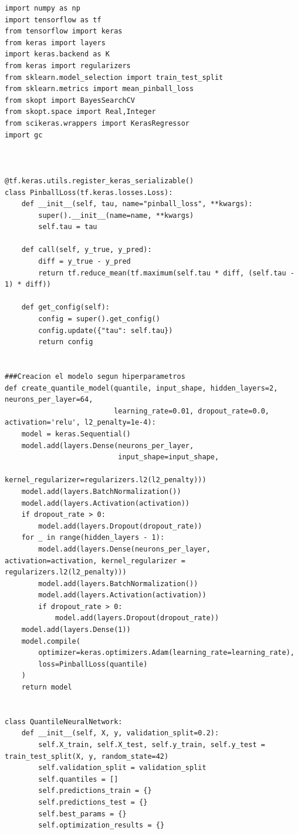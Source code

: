\documentclass[11pt]{book}
\theoremstyle{plain} %
\theoremstyle{definition} %
\begin{document}
 \begin{lstlisting}[style=pythonstyle, caption=neuralnetwork.py]
   import numpy as np
import tensorflow as tf
from tensorflow import keras
from keras import layers
import keras.backend as K
from keras import regularizers
from sklearn.model_selection import train_test_split
from sklearn.metrics import mean_pinball_loss
from skopt import BayesSearchCV
from skopt.space import Real,Integer
from scikeras.wrappers import KerasRegressor
import gc



@tf.keras.utils.register_keras_serializable()
class PinballLoss(tf.keras.losses.Loss):
    def __init__(self, tau, name="pinball_loss", **kwargs):
        super().__init__(name=name, **kwargs)
        self.tau = tau

    def call(self, y_true, y_pred):
        diff = y_true - y_pred
        return tf.reduce_mean(tf.maximum(self.tau * diff, (self.tau - 1) * diff))

    def get_config(self):
        config = super().get_config()
        config.update({"tau": self.tau})
        return config


###Creacion el modelo segun hiperparametros
def create_quantile_model(quantile, input_shape, hidden_layers=2, neurons_per_layer=64,
                          learning_rate=0.01, dropout_rate=0.0, activation='relu', l2_penalty=1e-4):
    model = keras.Sequential()
    model.add(layers.Dense(neurons_per_layer,
                           input_shape=input_shape,
                           kernel_regularizer=regularizers.l2(l2_penalty)))
    model.add(layers.BatchNormalization()) 
    model.add(layers.Activation(activation))
    if dropout_rate > 0:
        model.add(layers.Dropout(dropout_rate))
    for _ in range(hidden_layers - 1):
        model.add(layers.Dense(neurons_per_layer, activation=activation, kernel_regularizer = regularizers.l2(l2_penalty)))
        model.add(layers.BatchNormalization())  
        model.add(layers.Activation(activation))
        if dropout_rate > 0:
            model.add(layers.Dropout(dropout_rate))
    model.add(layers.Dense(1))
    model.compile(
        optimizer=keras.optimizers.Adam(learning_rate=learning_rate),
        loss=PinballLoss(quantile)
    )
    return model


class QuantileNeuralNetwork:
    def __init__(self, X, y, validation_split=0.2):
        self.X_train, self.X_test, self.y_train, self.y_test = train_test_split(X, y, random_state=42)
        self.validation_split = validation_split
        self.quantiles = []
        self.predictions_train = {}
        self.predictions_test = {}
        self.best_params = {}
        self.optimization_results = {}


\end{lstlisting}
\end{document}
